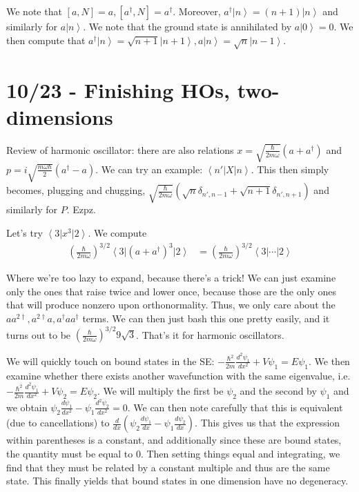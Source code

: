 \documentclass[10pt]{report}
\newcommand{\bra}[1]{\left<#1\right|}
\newcommand{\ket}[1]{\left|#1\right>}
\newcommand{\rd}[2]{\frac{d#1}{d#2}}
\begin{document}
We note that $[a,N] = a, [a^\dagger,N] = a^\dagger$. Moreover, $a^\dagger\ket{n}=(n+1)\ket{n}$ and similarly for $a\ket{n}$. We note that the ground state is annihilated by $a\ket{0}=0$. We then compute that $a^\dagger \ket{n} = \sqrt{n+1}\ket{n+1},a\ket{n} = \sqrt{n}\ket{n-1}$. 

\chapter{10/23 - Finishing HOs, two-dimensions}

Review of harmonic oscillator: there are also relations $x=\sqrt{\frac{\hbar}{2m\omega}}\left( a+a^\dagger \right)$ and $p = i\sqrt{\frac{m\omega\hbar}{2}}\left( a^\dagger -a \right)$. We can try an example: $\bra{n'}X\ket{n}$. This then simply becomes, plugging and chugging, $\sqrt{\frac{\hbar}{2m\omega}}\left( \sqrt{n}\delta_{n',n-1} + \sqrt{n+1}\delta_{n',n+1} \right)$ and similarly for $P$. Ezpz.

Let's try $\bra{3}x^3\ket{2}$. We compute
\begin{align}
	\left( \frac{\hbar}{2m\omega} \right)^{3/2}\bra{3}(a+a^\dagger)^3\ket{2}&= \left( \frac{\hbar}{2m\omega} \right)^{3/2}\bra{3}\cdots\ket{2}
\end{align}

Where we're too lazy to expand, because there's a trick! We can just examine only the ones that raise twice and lower once, because those are the only ones that will produce nonzero upon orthonormality. Thus, we only care about the $aa^{2\dagger}, a^{2\dagger}a, a^\dagger a a^\dagger$ terms. We can then just bash this one pretty easily, and it turns out to be $\left( \frac{\hbar}{2m\omega} \right)^{3/2}9\sqrt{3}$. That's it for harmonic oscillators.

We will quickly touch on bound states in the SE: $-\frac{\hbar^2}{2m}\frac{d^2\psi_1}{dx^2} + V\psi_1 = E\psi_1$. We then examine whether there exists another wavefunction with the same eigenvalue, i.e. $-\frac{\hbar^2}{2m}\frac{d^2\psi_1}{dx^2} + V\psi_2 = E\psi_2$. We will multiply the first be $\psi_2$ and the second by $\psi_1$ and we obtain $\psi_2\frac{d\psi_1}{dx^2} - \psi_1\frac{d^2\psi_2}{dx^2} = 0$. We can then note carefully that this is equivalent (due to cancellations) to $\rd{}{x}\left( \psi_2\rd{\psi_1}{x} - \psi_1\rd{\psi_2}{x} \right)$. This gives us that the expression within parentheses is a constant, and additionally since these are bound states, the quantity must be equal to $0$. Then setting things equal and integrating, we find that they must be related by a constant multiple and thus are the same state. This finally yields that bound states in one dimension have no degeneracy.
\end{document}
